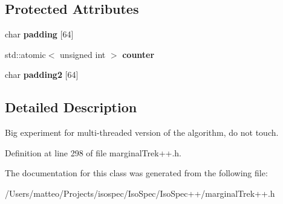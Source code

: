 \subsection*{Protected Attributes}
\begin{DoxyCompactItemize}
\item 
\mbox{\label{class_iso_spec_1_1_sync_marginal_a1f01c6fe03bdc15928f577f87764b221}} 
char {\bfseries padding} \mbox{[}64\mbox{]}
\item 
\mbox{\label{class_iso_spec_1_1_sync_marginal_a88c68e76999fb1e95120172ce050b645}} 
std\+::atomic$<$ unsigned int $>$ {\bfseries counter}
\item 
\mbox{\label{class_iso_spec_1_1_sync_marginal_ad8c8fda5c6d7f772ed814fb318d58a58}} 
char {\bfseries padding2} \mbox{[}64\mbox{]}
\end{DoxyCompactItemize}


\subsection{Detailed Description}
Big experiment for multi-\/threaded version of the algorithm, do not touch. 

Definition at line 298 of file marginal\+Trek++.\+h.



The documentation for this class was generated from the following file\+:\begin{DoxyCompactItemize}
\item 
/\+Users/matteo/\+Projects/isospec/\+Iso\+Spec/\+Iso\+Spec++/marginal\+Trek++.\+h\end{DoxyCompactItemize}
